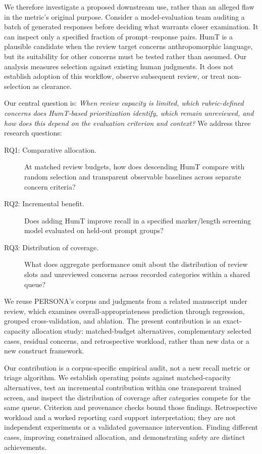 \documentclass[manuscript,screen,review,anonymous]{acmart}
\begin{document}
We therefore investigate a proposed downstream use, rather than an alleged flaw in the metric's original purpose. Consider a model-evaluation team auditing a batch of generated responses before deciding what warrants closer examination. It can inspect only a specified fraction of prompt--response pairs. HumT is a plausible candidate when the review target concerns anthropomorphic language, but its suitability for other concerns must be tested rather than assumed. Our analysis measures selection against existing human judgments. It does not establish adoption of this workflow, observe subsequent review, or treat non-selection as clearance.

Our central question is: \emph{When review capacity is limited, which rubric-defined concerns does HumT-based prioritization identify, which remain unreviewed, and how does this depend on the evaluation criterion and context?} We address three research questions:
\begin{description}
\item[RQ1: Comparative allocation.] At matched review budgets, how does descending HumT compare with random selection and transparent observable baselines across separate concern criteria?
\item[RQ2: Incremental benefit.] Does adding HumT improve recall in a specified marker/length screening model evaluated on held-out prompt groups?
\item[RQ3: Distribution of coverage.] What does aggregate performance omit about the distribution of review slots and unreviewed concerns across recorded categories within a shared queue?
\end{description}

We reuse PERSONA's corpus and judgments from a related manuscript under review, which examines overall-appropriateness prediction through regression, grouped cross-validation, and ablation. The present contribution is an exact-capacity allocation study: matched-budget alternatives, complementary selected cases, residual concerns, and retrospective workload, rather than new data or a new construct framework.

Our contribution is a corpus-specific empirical audit, not a new recall metric or triage algorithm. We establish operating points against matched-capacity alternatives, test an incremental contribution within one transparent trained screen, and inspect the distribution of coverage after categories compete for the same queue. Criterion and provenance checks bound those findings. Retrospective workload and a worked reporting card support interpretation; they are not independent experiments or a validated governance intervention. Finding different cases, improving constrained allocation, and demonstrating safety are distinct achievements.
\end{document}
